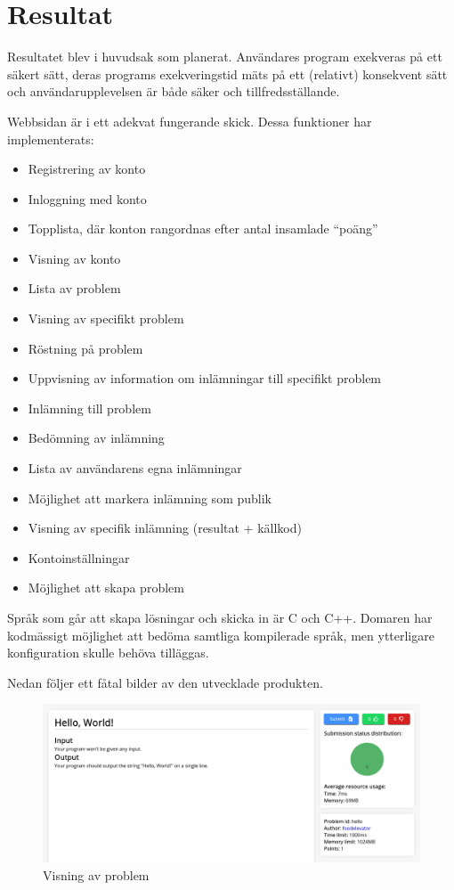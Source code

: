 \documentclass{article}
\begin{document}
\section{Resultat}

Resultatet blev i huvudsak som planerat. Användares program exekveras på ett
säkert sätt, deras programs exekveringstid mäts på ett (relativt) konsekvent
sätt och användarupplevelsen är både säker och tillfredsställande.

Webbsidan är i ett adekvat fungerande skick. Dessa funktioner har
implementerats:

\begin{itemize}
	\item Registrering av konto
	\item Inloggning med konto
	\item Topplista, där konton rangordnas efter antal insamlade ``poäng''
	\item Visning av konto
	\item Lista av problem
	\item Visning av specifikt problem
	\item Röstning på problem
	\item Uppvisning av information om inlämningar till specifikt problem
	\item Inlämning till problem
	\item Bedömning av inlämning
	\item Lista av användarens egna inlämningar
	\item Möjlighet att markera inlämning som publik
	\item Visning av specifik inlämning (resultat + källkod)
	\item Kontoinställningar
	\item Möjlighet att skapa problem
\end{itemize}

Språk som går att skapa lösningar och skicka in är C och C++. Domaren har
kodmässigt möjlighet att bedöma samtliga kompilerade språk, men ytterligare
konfiguration skulle behöva tilläggas.

Nedan följer ett fåtal bilder av den utvecklade produkten.

\begin{figure}[H]
	\centering
	\includegraphics[width=1\textwidth]{problem}
	\caption{Visning av problem}
\end{figure}
\end{document}
